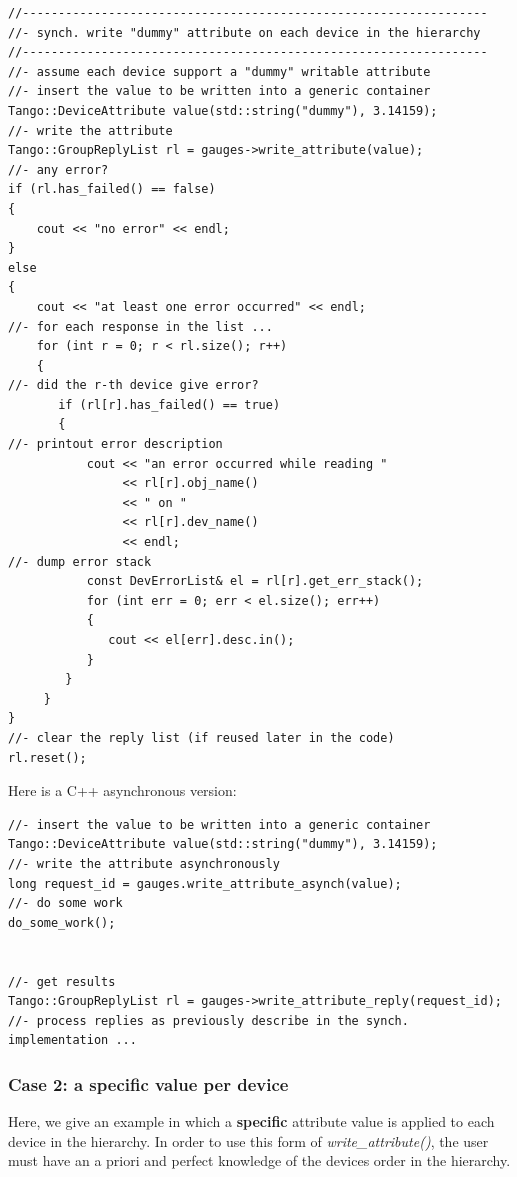 \begin{verbatim}
//-----------------------------------------------------------------
//- synch. write "dummy" attribute on each device in the hierarchy
//-----------------------------------------------------------------
//- assume each device support a "dummy" writable attribute
//- insert the value to be written into a generic container
Tango::DeviceAttribute value(std::string("dummy"), 3.14159);
//- write the attribute
Tango::GroupReplyList rl = gauges->write_attribute(value);
//- any error?
if (rl.has_failed() == false)
{
    cout << "no error" << endl;
}
else
{
    cout << "at least one error occurred" << endl;
//- for each response in the list ...
    for (int r = 0; r < rl.size(); r++)
    {
//- did the r-th device give error?
       if (rl[r].has_failed() == true)
       {
//- printout error description
           cout << "an error occurred while reading " 
                << rl[r].obj_name()
                << " on "
                << rl[r].dev_name()
                << endl;
//- dump error stack
           const DevErrorList& el = rl[r].get_err_stack();
           for (int err = 0; err < el.size(); err++)
           {
              cout << el[err].desc.in();
           }
        }
     }
}
//- clear the reply list (if reused later in the code)
rl.reset();
\end{verbatim}


Here is a C++ asynchronous version:


\begin{verbatim}
//- insert the value to be written into a generic container
Tango::DeviceAttribute value(std::string("dummy"), 3.14159);
//- write the attribute asynchronously
long request_id = gauges.write_attribute_asynch(value);
//- do some work
do_some_work();
 
 
//- get results
Tango::GroupReplyList rl = gauges->write_attribute_reply(request_id);
//- process replies as previously describe in the synch. implementation ...
\end{verbatim}



\subsubsection{Case 2: a specific value per device}
\label{sub:Case-2-writing}

Here, we give an example in which a \textbf{specific} attribute value
is applied to each device in the hierarchy. In order to use this form
of \emph{write\_attribute()}, the user must have an \textquotedbl{}a
priori\textquotedbl{} and \textquotedbl{}perfect\textquotedbl{} knowledge
of the devices order in the hierarchy. 

